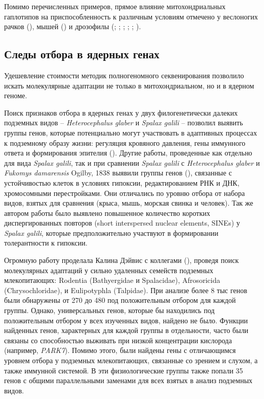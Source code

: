 Помимо перечисленных примеров, прямое влияние митохондриальных гаплотипов на приспособленность к различным условиям отмечено у веслоногих рачков (\cite{Schizas2001}), мышей (\cite{Takeda2000}) и дрозофилы (\cite{Nigro1994}; \cite{Hutter1995}; \cite{Kilpatrick1995}; \cite{Stordeur1997}; \cite{Rand2001}; \cite{James2003}). 


\subsection{Следы отбора в ядерных генах}

Удешевление стоимости методик полногеномного секвенирования позволило искать молекулярные адаптации не только в митохондриальном, но и в ядерном геноме.

Поиск признаков отбора в ядерных генах у двух филогенетически далеких подземных видов -- \textit{Heterocephalus glaber} и \textit{Spalax galili} -- позволил выявить группы генов, которые потенциально могут участвовать в адаптивных процессах к подземному образу жизни: регуляция кровяного давления, гены иммунного ответа и формирования эпителия (\cite{Fang2015}). Другие работы, проведенные как отдельно для вида \textit{Spalax galili}, так и при сравнении \textit{Spalax galili} с \textit{Heterocephalus glaber} и \textit{Fukomys damarensis} Ogilby, 1838 выявили группы генов (\cite{Fang2015}), связанные с устойчивостью клеток в условиях гипоксии, редактированием РНК и ДНК, хромосомными перестройками. Они отличались по уровню отбора от набора видов, взятых для сравнения (крыса, мышь, морская свинка и человек). Так же автором работы было выявлено повышенное количество коротких диспергированных повторов (short interspersed nuclear elements, SINEs) у \textit{Spalax galili}, которые предположительно участвуют в формировании толерантности к гипоксии. 

Огромную работу проделала Калина Дэйвис с коллегами (\cite{Davies2018}), проведя поиск молекулярных адаптаций у сильно удаленных семейств подземных млекопитающих: Rodentia (Bathyergidae и Spalacidae), Afrosoricida (Chrysochloridae), и Eulipotyphla (Talpidae). При анализе более 8 тыс генов были обнаружены от 270 до 480 под положительным отбором для каждой группы. Однако, универсальных генов, которые бы находились под положительным отбором у всех изученных видов, найдено не было. Функции найденных генов, характерных для каждой группы в отдельности, часто были связаны со способностью выживать при низкой концентрации кислорода (например, \textit{PARK7}). Помимо этого, были найдены гены с отличающимся уровнем отбора у подземных млекопитающих, связанные со зрением и слухом, а также иммунной системой. В эти физиологические группы также попали 35 генов с общими параллельными заменами для всех взятых в анализ подземных видов. 


